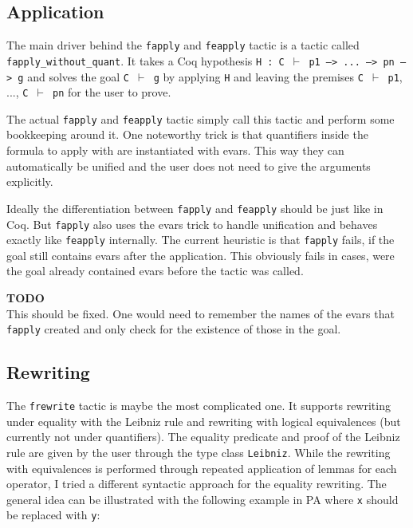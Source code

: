 \documentclass[12pt, a4paper]{article}
\newcommand{\improve}[1]{
	\vspace{3pt}
	\begin{boximprove}
		\parbox{\textwidth}{\textcolor{colorimprove}{\textbf{TODO}\\#1}}
	\end{boximprove}}
\begin{document}
\subsection{Application}

The main driver behind the \texttt{fapply} and \texttt{feapply} tactic is a tactic called \texttt{fapply\_without\_quant}.
It takes a Coq hypothesis \texttt{H : C $\vdash$ p1 --> ... --> pn --> g} and solves the goal \texttt{C $\vdash$ g} by applying \texttt{H} and leaving the premises \texttt{C $\vdash$ p1}, ..., \texttt{C $\vdash$ pn} for the user to prove.

The actual \texttt{fapply} and \texttt{feapply} tactic simply call this tactic and perform some bookkeeping around it.
One noteworthy trick is that quantifiers inside the formula to apply with are instantiated with evars.
This way they can automatically be unified and the user does not need to give the arguments explicitly.

\medskip\noindent
Ideally the differentiation between \texttt{fapply} and \texttt{feapply} should be just like in Coq.
But \texttt{fapply} also uses the evars trick to handle unification and behaves exactly like \texttt{feapply} internally.
The current heuristic is that \texttt{fapply} fails, if the goal still contains evars after the application.
This obviously fails in cases, were the goal already contained evars before the tactic was called.

\improve{This should be fixed. One would need to remember the names of the evars that \texttt{fapply} created and only check for the existence of those in the goal.}

\subsection{Rewriting}

The \texttt{frewrite} tactic is maybe the most complicated one.
It supports rewriting under equality with the Leibniz rule and rewriting with logical equivalences (but currently not under quantifiers).
The equality predicate and proof of the Leibniz rule are given by the user through the type class \texttt{Leibniz}.
While the rewriting with equivalences is performed through repeated application of lemmas for each operator, I tried a different syntactic approach for the equality rewriting.
The general idea can be illustrated with the following example in PA where \texttt{x} should be replaced with \texttt{y}:
\end{document}
